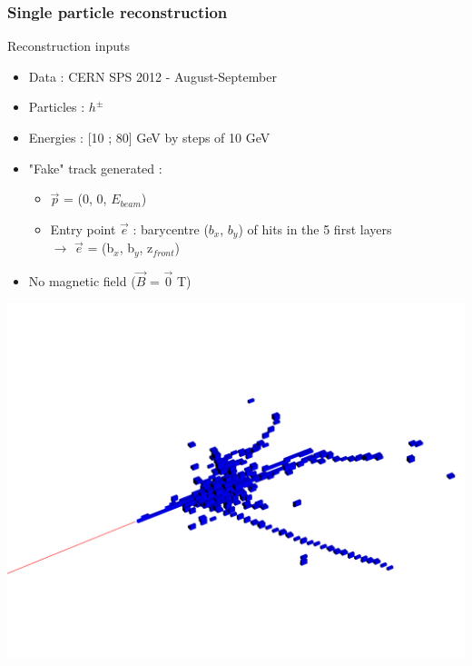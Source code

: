 \documentclass[8pt]{beamer}
\begin{document}
  \begin{frame}
  \frametitle{Single particle reconstruction}
    \begin{minipage}{0.56\linewidth}
      \begin{block}{Reconstruction inputs}
        \begin{itemize}
          \item Data : CERN SPS 2012 - August-September \\
          \item Particles : $h^{\pm}$
          \item Energies : [10 ; 80] GeV by steps of 10 GeV
          \item "Fake" track generated : 
          \begin{itemize}
            \item $\vec{p}$ = (0, 0, $E_{beam}$)
            \item Entry point $\vec{e}$ : barycentre ($b_x$, $b_y$) of hits in the 5 first layers \\
            $\rightarrow$ $\vec{e}$ = (b$_x$, b$_y$, z$_{front}$)
          \end{itemize}
          \item No magnetic field ($\vec{B}$ = $\vec{0}$ T)
        \end{itemize}
      \end{block}
    \end{minipage} \hfill
    \begin{minipage}{0.43\linewidth}
      \begin{center}
        \includegraphics[width=0.9\linewidth]{SingleParticleSetup.pdf}      
      \end{center}
    \end{minipage}
  \end{frame}
  
\end{document}
